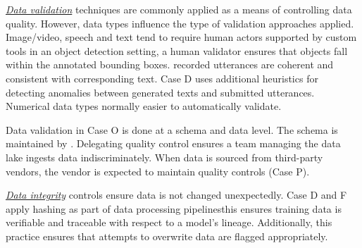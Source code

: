 \underline{\emph{Data validation}}
techniques are commonly applied as a means of controlling data quality. However, data types influence the type of validation approaches applied. \DIFaddbegin \DIFadd{\textcolor{green}{Validation of }}\DIFaddend Image/video, speech and text tend to require human actors supported by custom tools \DIFdelbegin {}\DIFdelend \DIFaddbegin \DIFadd{\textcolor{green}{For example,} }\DIFaddend in an object detection setting, a human validator ensures that objects fall within the annotated bounding boxes. \DIFdelbegin {}\DIFdelend \DIFaddbegin {}\DIFaddend recorded utterances are coherent and consistent with corresponding text. Case D uses additional heuristics for detecting anomalies between generated texts and submitted utterances. Numerical data types \DIFaddbegin \DIFadd{\textcolor{green}{are} }\DIFaddend normally easier to automatically validate.

Data validation in Case O is done at a schema and data level. The schema is maintained by \DIFdelbegin {}\textit{} %
\DIFdelend \DIFaddbegin {}\DIFaddend . Delegating quality control ensures a team managing the data lake ingests data indiscriminately. When data is sourced from third-party vendors, the vendor is expected to maintain quality controls (Case P). %

\underline{\emph{Data integrity}}
controls ensure data is not changed unexpectedly. Case D and F apply hashing as part of data processing pipelines\DIFaddbegin \DIFadd{\textcolor{green}{;} }\DIFaddend this ensures training data is verifiable and traceable with respect to a model's lineage. Additionally, this practice ensures that attempts to overwrite data are flagged appropriately.

